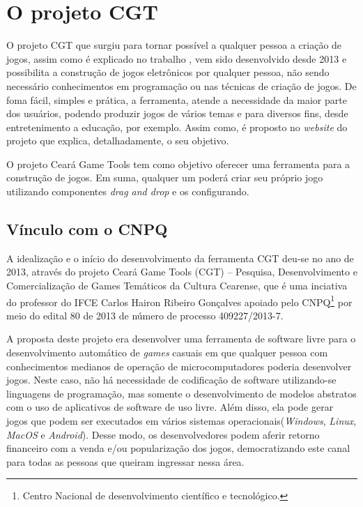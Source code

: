 \documentclass[12pt,twoside,openright,a4paper,english,brazil,sumario=tradicional]{abntex2}
\begin{document}
\section{O projeto CGT}
O projeto CGT que surgiu para tornar possível a qualquer pessoa a criação de jogos, assim como é explicado no trabalho \cite{monografia:aquino}, vem sido desenvolvido desde 2013 e possibilita a construção de jogos eletrônicos por qualquer pessoa, não sendo necessário conhecimentos em programação ou nas técnicas de criação de jogos. De foma fácil, simples e prática, a ferramenta, atende a necessidade da maior parte dos usuários, podendo produzir jogos de vários temas e para diversos fins, desde entretenimento a educação, por exemplo. Assim como, é proposto no \emph{website} do projeto que explica, detalhadamente, o seu objetivo.
\begin{citacao}
   O projeto Ceará Game Tools tem como objetivo oferecer uma ferramenta para a construção de jogos. Em suma, qualquer um poderá criar seu próprio jogo utilizando componentes \emph{drag and drop} e os configurando. \cite{website:projeto-cgt}
\end{citacao}
\subsection{Vínculo com o CNPQ}
A idealização e o início do desenvolvimento da ferramenta CGT deu-se no ano de 2013, através do projeto Ceará Game Tools (CGT) – Pesquisa, Desenvolvimento e Comercialização de Games Temáticos da Cultura Cearense, que é uma inciativa do professor do IFCE Carlos Hairon Ribeiro Gonçalves  apoiado pelo CNPQ\footnote{Centro Nacional de desenvolvimento científico e tecnológico.} por meio do edital 80 de 2013 de número de processo 409227/2013-7.

A proposta deste projeto era desenvolver uma ferramenta de software livre para o desenvolvimento automático de \emph{games} casuais em que qualquer pessoa com conhecimentos medianos de operação de microcomputadores poderia desenvolver jogos. Neste caso, não há necessidade de codificação de software utilizando-se linguagens de programação, mas somente o desenvolvimento de modelos abstratos com o uso de aplicativos de software de uso livre. Além disso, ela pode gerar jogos que podem ser executados em vários sistemas operacionais(\emph{Windows}, \emph{Linux}, \emph{MacOS} e \emph{Android}). Desse modo, os desenvolvedores podem aferir retorno financeiro com a venda e/ou popularização dos jogos, democratizando este canal para todas as pessoas que queiram ingressar nessa área.
\end{document}
